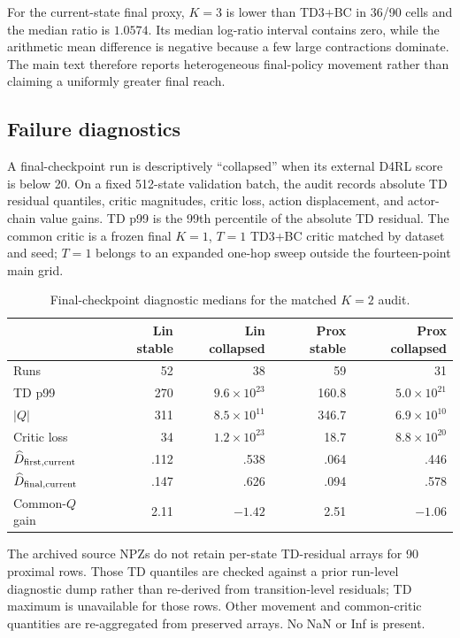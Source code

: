 \documentclass[letterpaper]{article}
\begin{document}
For the current-state final proxy, $K=3$ is lower than TD3+BC in 36/90 cells and the median ratio is $1.0574$. Its median log-ratio interval contains zero, while the arithmetic mean difference is negative because a few large contractions dominate. The main text therefore reports heterogeneous final-policy movement rather than claiming a uniformly greater final reach.

\subsection{Failure diagnostics}
A final-checkpoint run is descriptively ``collapsed'' when its external D4RL score is below 20. On a fixed 512-state validation batch, the audit records absolute TD residual quantiles, critic magnitudes, critic loss, action displacement, and actor-chain value gains. TD p99 is the 99th percentile of the absolute TD residual. The common critic is a frozen final $K=1$, $T=1$ TD3+BC critic matched by dataset and seed; $T=1$ belongs to an expanded one-hop sweep outside the fourteen-point main grid.

\begin{table}[h]
\caption{Final-checkpoint diagnostic medians for the matched $K=2$ audit.}
\centering
\small
\begin{tabular}{lrrrr}
\toprule
&Lin stable&Lin collapsed&Prox stable&Prox collapsed\\
\midrule
Runs&52&38&59&31\\
TD p99&270&$9.6\times10^{23}$&160.8&$5.0\times10^{21}$\\
$|Q|$&311&$8.5\times10^{11}$&346.7&$6.9\times10^{10}$\\
Critic loss&34&$1.2\times10^{23}$&18.7&$8.8\times10^{20}$\\
$\widehat D_{\rm first,current}$&.112&.538&.064&.446\\
$\widehat D_{\rm final,current}$&.147&.626&.094&.578\\
Common-$Q$ gain&2.11&$-1.42$&2.51&$-1.06$\\
\bottomrule
\end{tabular}
\label{tab:diagnostic_medians}
\end{table}

The archived source NPZs do not retain per-state TD-residual arrays for 90 proximal rows. Those TD quantiles are checked against a prior run-level diagnostic dump rather than re-derived from transition-level residuals; TD maximum is unavailable for those rows. Other movement and common-critic quantities are re-aggregated from preserved arrays. No NaN or Inf is present.
\end{document}
